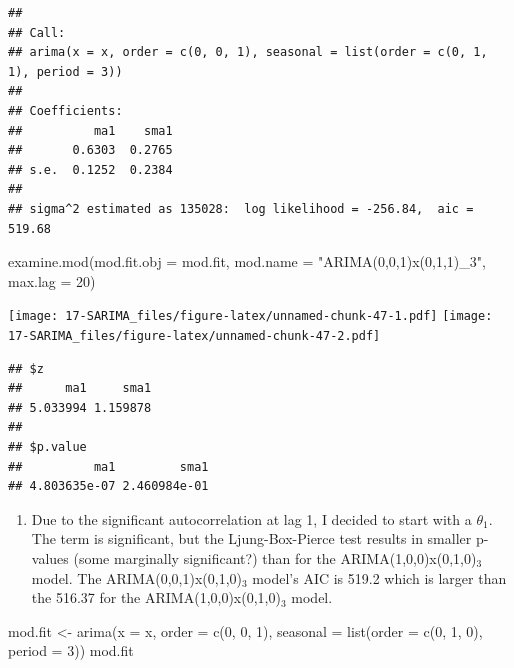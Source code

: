 \documentclass[
]{book}
\newenvironment{Shaded}{\begin{snugshade}}{\end{snugshade}}
\newcommand{\AttributeTok}[1]{\textcolor[rgb]{0.77,0.63,0.00}{#1}}
\newcommand{\DecValTok}[1]{\textcolor[rgb]{0.00,0.00,0.81}{#1}}
\newcommand{\FunctionTok}[1]{\textcolor[rgb]{0.00,0.00,0.00}{#1}}
\newcommand{\NormalTok}[1]{#1}
\newcommand{\OtherTok}[1]{\textcolor[rgb]{0.56,0.35,0.01}{#1}}
\newcommand{\StringTok}[1]{\textcolor[rgb]{0.31,0.60,0.02}{#1}}
\providecommand{\tightlist}{%
  \setlength{\itemsep}{0pt}\setlength{\parskip}{0pt}}
\theoremstyle{definition}
\theoremstyle{definition}
\theoremstyle{definition}
\theoremstyle{definition}
\theoremstyle{remark}
\begin{document}
\begin{verbatim}
## 
## Call:
## arima(x = x, order = c(0, 0, 1), seasonal = list(order = c(0, 1, 1), period = 3))
## 
## Coefficients:
##          ma1    sma1
##       0.6303  0.2765
## s.e.  0.1252  0.2384
## 
## sigma^2 estimated as 135028:  log likelihood = -256.84,  aic = 519.68
\end{verbatim}

\begin{Shaded}
\begin{Highlighting}[]
\FunctionTok{examine.mod}\NormalTok{(}\AttributeTok{mod.fit.obj =}\NormalTok{ mod.fit, }\AttributeTok{mod.name =} \StringTok{"ARIMA(0,0,1)x(0,1,1)\_3"}\NormalTok{, }\AttributeTok{max.lag =} \DecValTok{20}\NormalTok{)}
\end{Highlighting}
\end{Shaded}

\texttt{[image: 17-SARIMA\_files/figure-latex/unnamed-chunk-47-1.pdf]} \texttt{[image: 17-SARIMA\_files/figure-latex/unnamed-chunk-47-2.pdf]}

\begin{verbatim}
## $z
##      ma1     sma1 
## 5.033994 1.159878 
## 
## $p.value
##          ma1         sma1 
## 4.803635e-07 2.460984e-01
\end{verbatim}

\begin{enumerate}
\def\labelenumi{\arabic{enumi}.}
\setcounter{enumi}{1}
\tightlist
\item
  Due to the significant autocorrelation at lag 1, I decided to start with a \(\theta_1\). The term is significant, but the Ljung-Box-Pierce test results in smaller p-values (some marginally significant?) than for the ARIMA(1,0,0)x(0,1,0)\(_3\) model. The ARIMA(0,0,1)x(0,1,0)\(_3\) model's AIC is 519.2 which is larger than the 516.37 for the ARIMA(1,0,0)x(0,1,0)\(_3\) model.
\end{enumerate}

\begin{Shaded}
\begin{Highlighting}[]
\NormalTok{  mod.fit }\OtherTok{\textless{}{-}} \FunctionTok{arima}\NormalTok{(}\AttributeTok{x =}\NormalTok{ x, }\AttributeTok{order =} \FunctionTok{c}\NormalTok{(}\DecValTok{0}\NormalTok{, }\DecValTok{0}\NormalTok{, }\DecValTok{1}\NormalTok{), }\AttributeTok{seasonal =} \FunctionTok{list}\NormalTok{(}\AttributeTok{order =} \FunctionTok{c}\NormalTok{(}\DecValTok{0}\NormalTok{, }\DecValTok{1}\NormalTok{, }\DecValTok{0}\NormalTok{), }\AttributeTok{period =} \DecValTok{3}\NormalTok{))}
\NormalTok{  mod.fit}
\end{Highlighting}
\end{Shaded}
\end{document}

